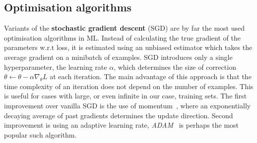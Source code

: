 \subsection{Optimisation algorithms}
Variants of the \textbf{stochastic gradient descent} (SGD) are by far the most used optimisation algorithms in ML. Instead of calculating the true gradient of the parameters w.r.t loss, it is estimated using an unbiased estimator which takes the average gradient on a minibatch of examples. SGD introduces only a single hyperparameter, the learning rate $\alpha$, which determines the size of correction $\theta \leftarrow \theta - \alpha \nabla_\theta L$ at each iteration. The main advantage of this approach is that the time complexity of an iteration does not depend on the number of examples. This is useful for cases with large, or even infinite in our case, training sets. The first improvement over vanilla SGD is the use of momentum~\cite{polyak1964some}, where an exponentially decaying average of past gradients determines the update direction. Second improvement is using an adaptive learning rate, \emph{ADAM}~\cite{kingma2014adam} is perhaps the most popular such algorithm. 

